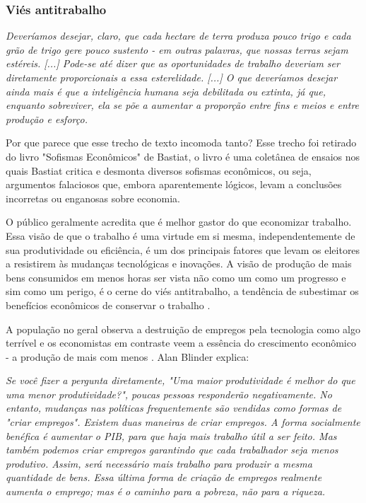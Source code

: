 \subsubsection{Viés antitrabalho}

\begin{citacao}
    \textit{
        Deveríamos desejar, claro, que cada hectare de terra produza pouco trigo e cada grão de trigo gere pouco sustento - em outras palavras, que nossas terras sejam estéreis. [...] Pode-se até dizer que as oportunidades de trabalho deveriam ser diretamente proporcionais a essa esterelidade. [...] O que deveríamos desejar ainda mais é que a inteligência humana seja debilitada ou extinta, já que, enquanto sobreviver, ela se põe a aumentar a proporção entre fins e meios e entre produção e esforço.
    } \newline
    \cite{bastiat1859sofismas}
\end{citacao}

Por que parece que esse trecho de texto incomoda tanto? Esse trecho foi retirado do livro "Sofismas Econômicos" de Bastiat, o livro é uma coletânea de ensaios nos quais Bastiat critica e desmonta diversos sofismas econômicos, ou seja, argumentos falaciosos que, embora aparentemente lógicos, levam a conclusões incorretas ou enganosas sobre economia.

O público geralmente acredita que é melhor gastor do que economizar trabalho. Essa visão de que o trabalho é uma virtude em si mesma, independentemente de sua produtividade ou eficiência, é um dos principais fatores que levam os eleitores a resistirem às mudanças tecnológicas e inovações. A visão de produção de mais bens consumidos em menos horas ser vista não como um como um progresso e sim como um perigo, é o cerne do viés antitrabalho, a tendência de subestimar os benefícios econômicos de conservar o trabalho \cite{The_Myth_of_the_Rational_Voter}.

A população no geral observa a destruição de empregos pela tecnologia como algo terrível e os economistas em contraste veem a essência do crescimento econômico - a produção de mais com menos \cite{Myths-of-Rich-and-Poor,krugman2015accidental,davis1996job,innocence_and_design,bastiat1995selected}. Alan Blinder explica:

\begin{citacao}
    \textit{
        Se você fizer a pergunta diretamente, "Uma maior produtividade é melhor do que uma menor produtividade?", poucas pessoas responderão negativamente. No entanto, mudanças nas políticas frequentemente são vendidas como formas de "criar empregos". Existem duas maneiras de criar empregos. A forma socialmente benéfica é aumentar o PIB, para que haja mais trabalho útil a ser feito. Mas também podemos criar empregos garantindo que cada trabalhador seja menos produtivo. Assim, será necessário mais trabalho para produzir a mesma quantidade de bens. Essa última forma de criação de empregos realmente aumenta o emprego; mas é o caminho para a pobreza, não para a riqueza.
    } \newline
    \cite{blinder1987hard}
\end{citacao}

